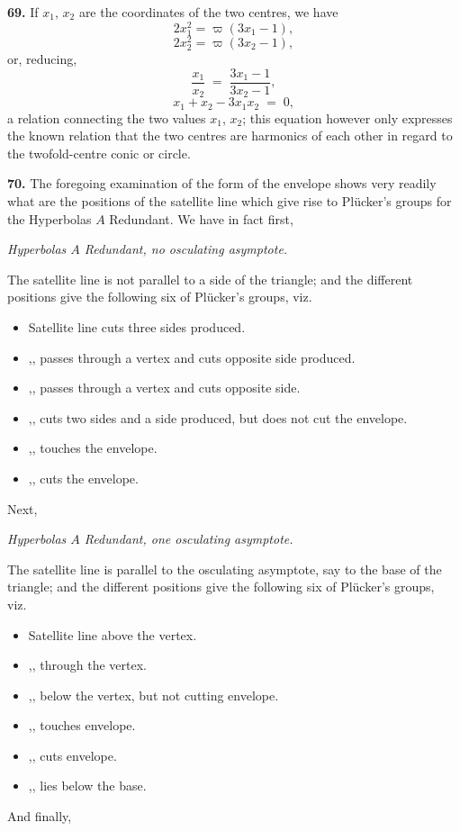 \documentclass[11pt,a4paper]{article}
\begin{document}
\medskip

\textbf{69.} If $x_{1}$, $x_{2}$ are the coordinates of the two centres, we have
\[
2 x_{1}^{2} = \varpi(3x_{1}-1),
\]
\[
2 x_{2}^{2} = \varpi(3x_{2}-1),
\]
or, reducing,
\[
\frac{x_{1}}{x_{2}} \;=\; \frac{3x_{1}-1}{3x_{2}-1},
\]
\[
x_{1}+x_{2} - 3 x_{1} x_{2} \;=\; 0,
\]
a relation connecting the two values $x_{1}$, $x_{2}$; this equation however only expresses the known relation that the two centres are harmonics of each other in regard to the twofold-centre conic or circle.

\medskip

\textbf{70.} The foregoing examination of the form of the envelope shows very readily what are the positions of the satellite line which give rise to Pl\"ucker's groups for the Hyperbolas $A$ Redundant. We have in fact first,
\smallskip

\noindent\emph{Hyperbolas $A$ Redundant, no osculating asymptote.}
\smallskip

The satellite line is not parallel to a side of the triangle; and the different positions give the following six of Pl\"ucker's groups, viz.\
\begin{itemize}\itemsep0pt
\item[I.] Satellite line cuts three sides produced.
\item[II.] ,, passes through a vertex and cuts opposite side produced.
\item[III.] ,, passes through a vertex and cuts opposite side.
\item[IV.] ,, cuts two sides and a side produced, but does not cut the envelope.
\item[V.] ,, touches the envelope.
\item[VI.] ,, cuts the envelope.
\end{itemize}
Next,
\smallskip

\noindent\emph{Hyperbolas $A$ Redundant, one osculating asymptote.}
\smallskip

The satellite line is parallel to the osculating asymptote, say to the base of the triangle; and the different positions give the following six of Pl\"ucker's groups, viz.\
\begin{itemize}\itemsep0pt
\item[IX.] Satellite line above the vertex.
\item[X.] ,, through the vertex.
\item[XI.] ,, below the vertex, but not cutting envelope.
\item[XII.] ,, touches envelope.
\item[XIII.] ,, cuts envelope.
\item[XIV.] ,, lies below the base.
\end{itemize}
And finally,
\smallskip
\end{document}
